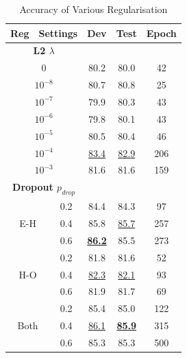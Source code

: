 \begin{table}[t]
\centering
\begin{tabular}{|c|c|c|c|c|}
\hline
\multicolumn{2}{|c|}{{\bf Reg　Settings}} & {\bf Dev } & {\bf Test } & {\bf Epoch} \\ \hline \hline
\multicolumn{2}{|c|}{{\bf L2 $\lambda$}}    &               &                &             \\ \hline
\multicolumn{2}{|c|}{0}                  & 80.2         & 80.0           & 42          \\ \hline
\multicolumn{2}{|c|}{$10^{-8}$}                  & 80.7          & 80.8          & 25          \\ \hline
\multicolumn{2}{|c|}{$10^{-7}$}                  & 79.9          & 80.3           & 43          \\ \hline
\multicolumn{2}{|c|}{$10^{-6}$}                  & 79.8          & 80.1           & 43         \\ \hline
\multicolumn{2}{|c|}{$10^{-5}$}                  & 80.5          & 80.4          & 46          \\ \hline
\multicolumn{2}{|c|}{$10^{-4}$}                  & {\underline{83.4}}          & {\underline{82.9}}           & 206          \\ \hline
\multicolumn{2}{|c|}{$10^{-3}$}                  & 81.6          & 81.6           & 159          \\ \hline \hline
\multicolumn{2}{|c|}{\bf Dropout $p_{drop}$}  &               &                &             \\ \hline
\multirow{3}{*}{E-H}      & 0.2          & 84.4          & 84.3          & 97          \\ \cline{2-5} 
                          & 0.4          & 85.8          & {\underline{85.7}}           & 257          \\ \cline{2-5} 
                          & 0.6          & {\underline{\bf 86.2}}         & 85.5           & 273          \\ \hline
\multirow{3}{*}{H-O}      & 0.2          & 81.8          & 81.6          & 52          \\ \cline{2-5} 
                          & 0.4          & {\underline{82.3}}          & {\underline{82.1}}          & 93          \\ \cline{2-5} 
                          & 0.6          & 81.9          & 81.7          & 69          \\ \hline
\multirow{3}{*}{Both}  & 0.2          & 85.4          & 85.0          & 122          \\ \cline{2-5} 
                          & 0.4          & {\underline{86.1}}         & {\underline{\bf 85.9}}           & 315          \\ \cline{2-5} 
                          & 0.6          & 85.3          & 85.3           & 500          \\ \hline
\end{tabular}
\caption{Accuracy of Various Regularisation}
\label{tab_regul}
\end{table}

